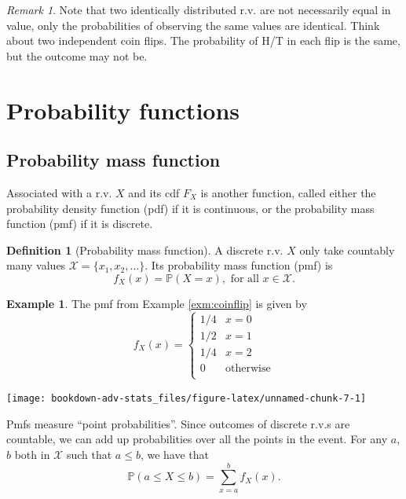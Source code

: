 \documentclass[
]{book}
\newcommand{\bbP}{\mathbb{P}}
\newcommand{\cX}{{\mathcal X}}
\theoremstyle{definition}
\newtheorem{definition}{Definition}[chapter]
\theoremstyle{definition}
\newtheorem{example}{Example}[chapter]
\theoremstyle{definition}
\theoremstyle{definition}
\theoremstyle{remark}
\newtheorem*{remark}{Remark}
\begin{document}
\begin{remark}
Note that two identically distributed r.v. are not necessarily equal in value, only the probabilities of observing the same values are identical.
Think about two independent coin flips. The probability of H/T in each flip is the same, but the outcome may not be.
\end{remark}

\hypertarget{probability-functions}{%
\section{Probability functions}\label{probability-functions}}

\hypertarget{probability-mass-function}{%
\subsection{Probability mass function}\label{probability-mass-function}}

Associated with a r.v. \(X\) and its cdf \(F_X\) is another function, called either the probability density function (pdf) if it is continuous, or the probability mass function (pmf) if it is discrete.

\begin{definition}[Probability mass function]
A discrete r.v. \(X\) only take countably many values \(\cX = \{x_1, x_2,\dots \}\).
Its probability mass function (pmf) is
\[
f_X(x) = \bbP(X=x), \text{ for all } x \in \cX.
\]
\end{definition}

\begin{example}

The pmf from Example \ref{exm:coinflip} is given by
\vspace{-0.5em}
\[
f_X(x) = \begin{cases}
1/4&x=0 \\
1/2&x=1 \\
1/4& x=2\\
0 &\text{otherwise}\\
\end{cases}
\]

\begin{center}\texttt{[image: bookdown-adv-stats\_files/figure-latex/unnamed-chunk-7-1]} \end{center}

\end{example}

Pmfs measure ``point probabilities''. Since outcomes of discrete r.v.s are countable, we can add up probabilities over all the points in the event.
For any \(a\), \(b\) both in \(\cX\) such that \(a \leq b\), we have that
\[
  \bbP(a \leq X \leq b) = \sum_{x=a}^b f_X(x).
\]
\end{document}
